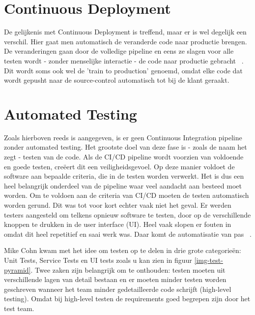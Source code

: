         \section{Continuous Deployment}
        De gelijkenis met Continuous Deployment is treffend, maar er is wel degelijk een verschil.
        Hier gaat men automatisch de veranderde code naar productie brengen. De veranderingen gaan door de volledige pipeline en eens ze slagen voor alle testen wordt - zonder menselijke interactie - de code naar productie gebracht ~\autocite{Claps2015}.
        Dit wordt soms ook wel de 'train to production' genoemd, omdat elke code dat wordt gepusht naar de source-control automatisch tot bij de klant geraakt.
        
        \section{Automated Testing}
        Zoals hierboven reeds is aangegeven, is er geen Continuous Integration pipeline zonder automated testing. Het grootste doel van deze fase is - zoals de naam het zegt - testen van de code. Als de CI/CD pipeline wordt voorzien van voldoende en goede testen, creëert dit een veiligheidsgevoel. Op deze manier voldoet de software aan bepaalde criteria, die in de testen worden verwerkt. Het is dus een heel belangrijk onderdeel van de pipeline waar veel aandacht aan besteed moet worden. 
        Om te voldoen aan de criteria van CI/CD moeten de testen automatisch worden gerund. Dit was tot voor kort echter vaak niet het geval. Er werden testers aangesteld om telkens opnieuw software te testen, door op de verschillende knoppen te drukken in de user interface (UI). Heel vaak slopen er fouten in omdat dit heel repetitief en saai werk was. Daar komt de automatisatie van pas ~\autocite{Vocke2018}.
        
        Mike Cohn kwam met het idee om testen op te delen in drie grote categorieën: Unit Tests, Service Tests en UI tests zoals u kan zien in figuur \ref{img-test-pyramid}.
        Twee zaken zijn belangrijk om te onthouden: testen moeten uit verschillende lagen van detail bestaan en er moeten minder testen worden geschreven wanneer het team minder gedetailleerde code schrijft (high-level testing). Omdat bij high-level testen de requirements goed begrepen zijn door het test team.
        
